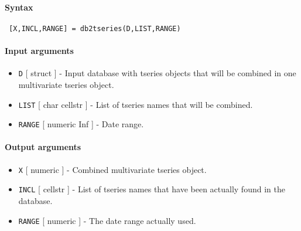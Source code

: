 


	\paragraph{Syntax}
 
 \begin{verbatim}
 [X,INCL,RANGE] = db2tseries(D,LIST,RANGE)
 \end{verbatim}
 
 \paragraph{Input arguments}
 
 \begin{itemize}
 \item
   \texttt{D} {[} struct {]} - Input database with tseries objects that
   will be combined in one multivariate tseries object.
 \item
   \texttt{LIST} {[} char \textbar{} cellstr {]} - List of tseries names
   that will be combined.
 \item
   \texttt{RANGE} {[} numeric \textbar{} Inf {]} - Date range.
 \end{itemize}
 
 \paragraph{Output arguments}
 
 \begin{itemize}
 \item
   \texttt{X} {[} numeric {]} - Combined multivariate tseries object.
 \item
   \texttt{INCL} {[} cellstr {]} - List of tseries names that have been
   actually found in the database.
 \item
   \texttt{RANGE} {[} numeric {]} - The date range actually used.
 \end{itemize}


